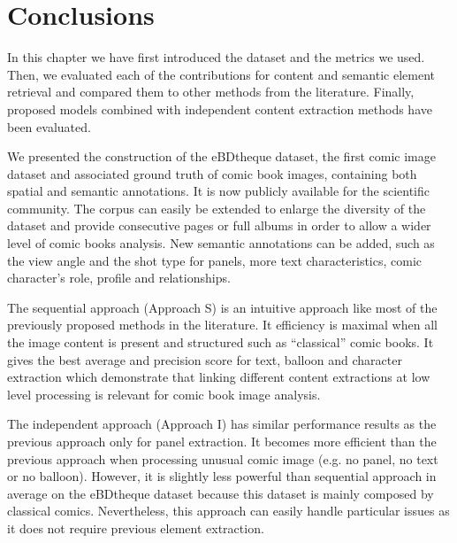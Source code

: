 

\section{Conclusions}
\label{sub:ex:conclusion}

In this chapter we have first introduced the dataset and the metrics we used.
Then, we evaluated each of the contributions for content and semantic element retrieval and compared them to other methods from the literature.
Finally, proposed models combined with independent content extraction methods have been evaluated.

We presented the construction of the eBDtheque dataset, the first comic image dataset and associated ground truth of comic book images, containing both spatial and semantic annotations.
It is now publicly available for the scientific community.
The corpus can easily be extended to enlarge the diversity of the dataset and provide consecutive pages or full albums in order to allow a wider level of comic books analysis.
New semantic annotations can be added, such as the view angle and the shot type for panels, more text characteristics, comic character's role, profile and relationships. 

The sequential approach (Approach S) is an intuitive approach like most of the previously proposed methods in the literature.
It efficiency is maximal when all the image content is present and structured such as ``classical'' comic books.
It gives the best average and precision score for text, balloon and character extraction which demonstrate that linking different content extractions at low level processing is relevant for comic book image analysis.

The independent approach (Approach I) has similar performance results as the previous approach only for panel extraction.
It becomes more efficient than the previous approach when processing unusual comic image (e.g. no panel, no text or no balloon).
However, it is slightly less powerful than sequential approach in average on the eBDtheque dataset because this dataset is mainly composed by classical comics.
Nevertheless, this approach can easily handle particular issues as it does not require previous element extraction.

